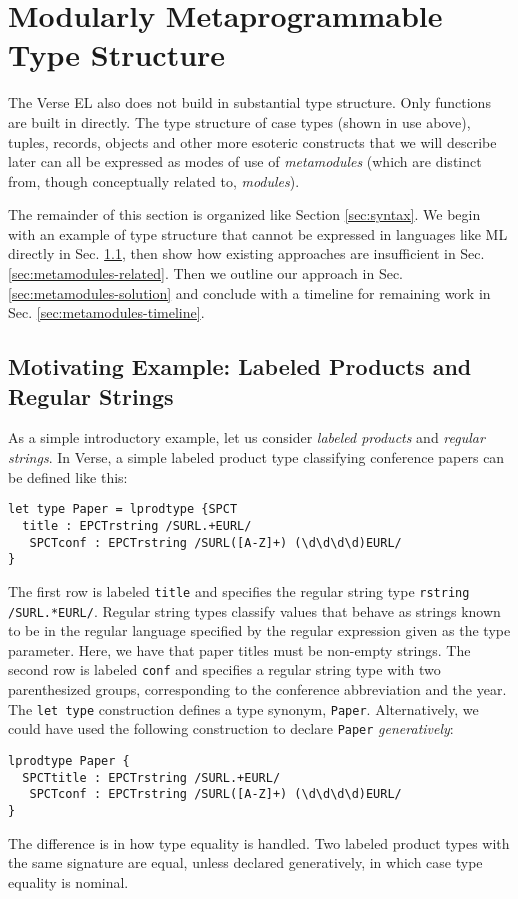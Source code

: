
\section{Modularly Metaprogrammable Type Structure}\label{sec:metamodules}
The Verse EL also does not build in substantial type structure. Only functions are built in directly. The type structure of case types (shown in use above), tuples, records, objects and other more esoteric constructs that we will describe later can all be expressed as modes of use of \emph{metamodules} (which are distinct from, though conceptually related to, \emph{modules}). 

The remainder of this section is organized like Section \ref{sec:syntax}. We begin with an example of type structure that cannot be expressed in languages like ML directly in Sec. \ref{sec:metamodules-example}, then show how existing approaches are insufficient in Sec. \ref{sec:metamodules-related}. Then we outline our approach in Sec. \ref{sec:metamodules-solution} and conclude with a timeline for remaining work in Sec. \ref{sec:metamodules-timeline}. 

\subsection{Motivating Example: Labeled Products and Regular Strings}\label{sec:metamodules-example}
As a simple introductory example, let us consider \emph{labeled products} and \emph{regular strings}. In Verse, a simple labeled product type classifying conference papers can be defined like this:
\begin{lstlisting}[numbers=none]
let type Paper = lprodtype {SPCT
  title : EPCTrstring /SURL.+EURL/
   SPCTconf : EPCTrstring /SURL([A-Z]+) (\d\d\d\d)EURL/
}
\end{lstlisting}
The first row is labeled \lstinline{title} and specifies the regular string type \lstinline{rstring /SURL.*EURL/}. Regular string types classify values that behave as strings known to be in the regular language specified by the regular expression given as the type parameter. Here, we have that paper titles must be non-empty strings. The second row is labeled \lstinline{conf} and specifies a regular string type with two parenthesized groups, corresponding to the conference abbreviation and the year.
The \lstinline{let type} construction defines a type synonym, \lstinline{Paper}. Alternatively, we could have used the following construction to declare \lstinline{Paper} \emph{generatively}:
\begin{lstlisting}[numbers=none]
lprodtype Paper {
  SPCTtitle : EPCTrstring /SURL.+EURL/
   SPCTconf : EPCTrstring /SURL([A-Z]+) (\d\d\d\d)EURL/
}
\end{lstlisting}
The difference is in how type equality is handled. Two labeled product types with the same signature are equal, unless declared generatively, in which case type equality is nominal.

